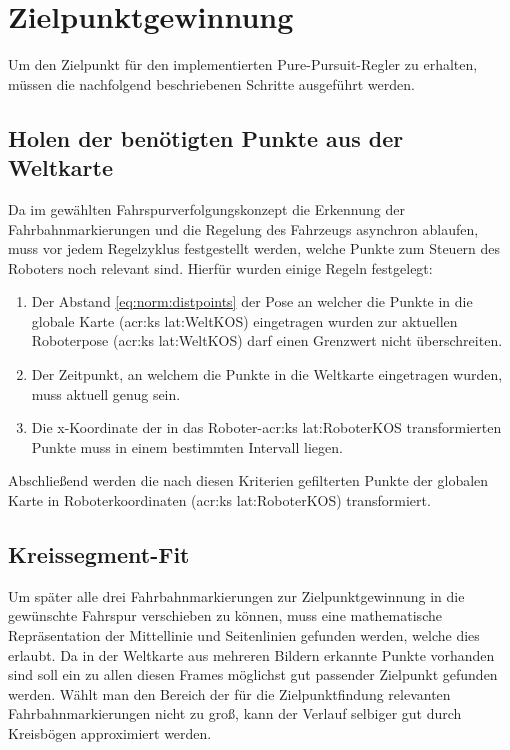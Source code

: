 \section{Zielpunktgewinnung}
Um den Zielpunkt für den implementierten \glqq Pure-Pursuit\grqq -Regler zu erhalten, müssen die nachfolgend beschriebenen Schritte ausgeführt werden.

\subsection{Holen der benötigten Punkte aus der Weltkarte}
Da im gewählten Fahrspurverfolgungskonzept die Erkennung der Fahrbahnmarkierungen und die Regelung des Fahrzeugs asynchron ablaufen, muss vor jedem Regelzyklus festgestellt werden, welche Punkte zum Steuern des Roboters noch relevant sind. Hierfür wurden einige Regeln festgelegt:
\begin{enumerate}
\item 
Der Abstand \eqref{eq:norm:distpoints} der Pose an welcher die Punkte in die globale Karte (\gls{acr:ks} \gls{lat:WeltKOS}) eingetragen wurden zur aktuellen Roboterpose  (\gls{acr:ks} \gls{lat:WeltKOS}) darf einen Grenzwert nicht überschreiten.
\item
Der Zeitpunkt, an welchem die Punkte in die Weltkarte eingetragen wurden, muss aktuell genug sein.
\item
Die x-Koordinate der in das Roboter-\gls{acr:ks} \gls{lat:RoboterKOS} transformierten Punkte muss in einem bestimmten Intervall liegen.
\end{enumerate}
Abschließend werden die nach diesen Kriterien gefilterten Punkte der globalen Karte in Roboterkoordinaten (\gls{acr:ks} \gls{lat:RoboterKOS}) transformiert.

\subsection{Kreissegment-Fit} \label{regelung:zielpunkt:kreissegment-fit}
Um später alle drei Fahrbahnmarkierungen zur Zielpunktgewinnung in die gewünschte Fahrspur verschieben zu können, muss eine mathematische Repräsentation der Mittellinie und Seitenlinien gefunden werden, welche dies erlaubt. Da in der Weltkarte aus mehreren Bildern erkannte Punkte vorhanden sind soll ein zu allen diesen Frames möglichst gut passender Zielpunkt gefunden werden. Wählt man den Bereich der für die Zielpunktfindung relevanten Fahrbahnmarkierungen nicht zu groß, kann der Verlauf selbiger gut durch Kreisbögen approximiert werden. 

